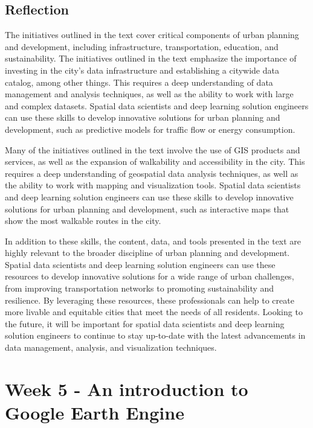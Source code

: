 \documentclass[
  letterpaper,
  DIV=11,
  numbers=noendperiod]{scrreprt}
\begin{document}
\hypertarget{reflection-2}{%
\section{Reflection}\label{reflection-2}}

The initiatives outlined in the text cover critical components of urban
planning and development, including infrastructure, transportation,
education, and sustainability. The initiatives outlined in the text
emphasize the importance of investing in the city's data infrastructure
and establishing a citywide data catalog, among other things. This
requires a deep understanding of data management and analysis
techniques, as well as the ability to work with large and complex
datasets. Spatial data scientists and deep learning solution engineers
can use these skills to develop innovative solutions for urban planning
and development, such as predictive models for traffic flow or energy
consumption.

Many of the initiatives outlined in the text involve the use of GIS
products and services, as well as the expansion of walkability and
accessibility in the city. This requires a deep understanding of
geospatial data analysis techniques, as well as the ability to work with
mapping and visualization tools. Spatial data scientists and deep
learning solution engineers can use these skills to develop innovative
solutions for urban planning and development, such as interactive maps
that show the most walkable routes in the city.

In addition to these skills, the content, data, and tools presented in
the text are highly relevant to the broader discipline of urban planning
and development. Spatial data scientists and deep learning solution
engineers can use these resources to develop innovative solutions for a
wide range of urban challenges, from improving transportation networks
to promoting sustainability and resilience. By leveraging these
resources, these professionals can help to create more livable and
equitable cities that meet the needs of all residents. Looking to the
future, it will be important for spatial data scientists and deep
learning solution engineers to continue to stay up-to-date with the
latest advancements in data management, analysis, and visualization
techniques.


\hypertarget{week-5---an-introduction-to-google-earth-engine}{%
\chapter{Week 5 - An introduction to Google Earth
Engine}\label{week-5---an-introduction-to-google-earth-engine}}
\end{document}
